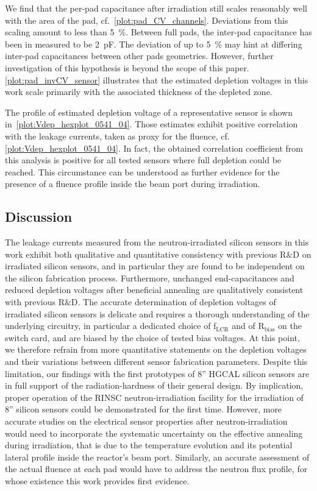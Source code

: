 We find that the per-pad capacitance after irradiation still scales reasonably well with the area of the pad, cf.~\ref{plot:pad_CV_channels}.
Deviations from this scaling amount to less than \SI{5}{\percent}.
Between full pads, the inter-pad capacitance has been in measured to be \SI{2}{\pico\farad}.
The deviation of up to \SI{5}{\percent} may hint at differing inter-pad capacitances between other pads geometries.
However, further investigation of this hypothesis is beyond the scope of this paper. 
\ref{plot:pad_invCV_sensor} illustrates that the estimated depletion voltages in this work scale primarily with the associated thickness of the depleted zone. 

The profile of estimated depletion voltage of a representative sensor is shown in~\ref{plot:Vdep_hexplot_0541_04}.
Those estimates exhibit positive correlation with the leakage currents, taken as proxy for the fluence, cf. \ref{plot:Vdep_hexplot_0541_04}.
In fact, the obtained correlation coefficient from this analysis is positive for all tested sensors where full depletion could be reached.
This circumstance can be understood as further evidence for the presence of a fluence profile inside the beam port during irradiation.

\subsection{Discussion}
\label{subsec:discussion}
The leakage currents measured from the neutron-irradiated silicon sensors in this work exhibit both qualitative and quantitative consistency with previous R$\&$D on irradiated silicon sensors, and in particular they are found to be independent on the silicon fabrication process.
Furthermore, unchanged end-capacitances and reduced depletion voltages after beneficial annealing are qualitatively consistent with previous R$\&$D.
The accurate determination of depletion voltages of irradiated silicon sensors is delicate and requires a thorough understanding of the underlying circuitry, in particular a dedicated choice of f$_\text{LCR}$ and of R$_\text{bias}$ on the switch card, and are biased by the choice of tested bias voltages.
At this point, we therefore refrain from more quantitative statements on the depletion voltages and their variations between different sensor fabrication parameters.\newline
Despite this limitation, our findings with the first prototypes of 8'' HGCAL silicon sensors are in full support of the radiation-hardness of their general design.
By implication, proper operation of the RINSC neutron-irradiation facility for the irradiation of 8'' silicon sensors could be demonstrated for the first time.
However, more accurate studies on the electrical sensor properties after neutron-irradiation would need to incorporate the systematic uncertainty on the effective annealing during irradiation, that is due to the temperature evolution and its potential lateral profile inside the reactor's beam port.
Similarly, an accurate assessment of the actual fluence at each pad would have to address the neutron flux profile, for whose existence this work provides first evidence.
